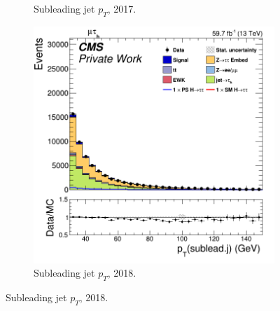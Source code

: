 \begin{figure}
\begin{subfigure}[b]{0.33\linewidth}
    \caption{Subleading jet $p_T$, 2017.} 
    \vspace{0.5ex}
  \end{subfigure} 
    \begin{subfigure}[b]{0.33\linewidth}
    \centering
    \includegraphics[width=\linewidth]{Chapitre7/Images/CtrlPlots/2018/SubleadingJetpT.png} 
    \caption{Subleading jet $p_T$, 2018.} 
    \vspace{0.5ex}
  \end{subfigure}
  

\end{figure}
